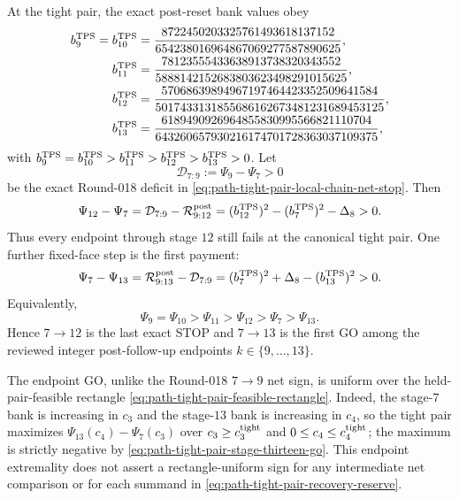 \begin{proposition}
At the tight pair, the exact post-reset bank values obey
\begin{align}
 b_9^{\rm TPS}=b_{10}^{\rm TPS}
 &=\frac{8722450203325761493618137152}
         {654238016964867069277587890625},
 \notag\\
 b_{11}^{\rm TPS}
 &=\frac{78123555433638913738320343552}
         {5888142152683803623498291015625},
 \notag\\
 b_{12}^{\rm TPS}
 &=\frac{57068639894967197464423352509641584}
         {5017433131855686162673481231689453125},
 \notag\\
 b_{13}^{\rm TPS}
 &=\frac{6189490926964855830995566821110704}
         {643260657930216174701728363037109375},
 \label{eq:path-tight-pair-post-bank-values}
\end{align}
with
$b_9^{\rm TPS}=b_{10}^{\rm TPS}>b_{11}^{\rm TPS}>
b_{12}^{\rm TPS}>b_{13}^{\rm TPS}>0$.
Let
\begin{equation*}
 \mathcal D_{7:9}:=\Psi_9-\Psi_7>0
\end{equation*}
be the exact Round-018 deficit in
\cref{eq:path-tight-pair-local-chain-net-stop}.  Then
\begin{equation}
 \Psi_{12}-\Psi_7
 =\mathcal D_{7:9}-\mathcal R_{9:12}^{\rm post}
 =(b_{12}^{\rm TPS})^2-(b_7^{\rm TPS})^2-\Delta_8
 >0.
 \label{eq:path-tight-pair-stage-twelve-stop}
\end{equation}
Thus every endpoint through stage $12$ still fails at the canonical tight
pair.  One further fixed-face step is the first payment:
\begin{equation}
 \Psi_7-\Psi_{13}
 =\mathcal R_{9:13}^{\rm post}-\mathcal D_{7:9}
 =(b_7^{\rm TPS})^2+\Delta_8-(b_{13}^{\rm TPS})^2
 >0.
 \label{eq:path-tight-pair-stage-thirteen-go}
\end{equation}
Equivalently,
\begin{equation}
 \Psi_9=\Psi_{10}>\Psi_{11}>\Psi_{12}>\Psi_7>\Psi_{13}.
 \label{eq:path-tight-pair-recovery-order}
\end{equation}
Hence $7\to12$ is the last exact STOP and $7\to13$ is the first GO among
the reviewed integer post-follow-up endpoints $k\in\{9,\ldots,13\}$.

The endpoint GO, unlike the Round-018 $7\to9$ net sign, is uniform over the
held-pair-feasible rectangle
\cref{eq:path-tight-pair-feasible-rectangle}.  Indeed, the stage-$7$ bank is
increasing in $c_3$ and the stage-$13$ bank is increasing in $c_4$, so the
tight pair maximizes $\Psi_{13}(c_4)-\Psi_7(c_3)$ over
$c_3\geq c_3^{\rm tight}$ and $0\leq c_4\leq c_4^{\rm tight}$; the maximum
is strictly negative by
\cref{eq:path-tight-pair-stage-thirteen-go}.  This endpoint extremality does
not assert a rectangle-uniform sign for any intermediate net comparison or
for each summand in \cref{eq:path-tight-pair-recovery-reserve}.


\end{proposition}
